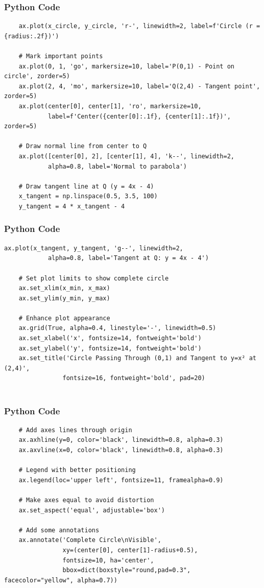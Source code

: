 \documentclass{beamer}
\numberwithin{equation}{section}
\begin{document}
\begin{frame}[fragile]
    \frametitle{Python Code}
    \begin{lstlisting}
    ax.plot(x_circle, y_circle, 'r-', linewidth=2, label=f'Circle (r = {radius:.2f})')
    
    # Mark important points
    ax.plot(0, 1, 'go', markersize=10, label='P(0,1) - Point on circle', zorder=5)
    ax.plot(2, 4, 'mo', markersize=10, label='Q(2,4) - Tangent point', zorder=5)
    ax.plot(center[0], center[1], 'ro', markersize=10, 
            label=f'Center({center[0]:.1f}, {center[1]:.1f})', zorder=5)
    
    # Draw normal line from center to Q
    ax.plot([center[0], 2], [center[1], 4], 'k--', linewidth=2, 
            alpha=0.8, label='Normal to parabola')
    
    # Draw tangent line at Q (y = 4x - 4)
    x_tangent = np.linspace(0.5, 3.5, 100)
    y_tangent = 4 * x_tangent - 4
\end{lstlisting}
\end{frame}
\begin{frame}[fragile]
    \frametitle{Python Code}
    \begin{lstlisting}
ax.plot(x_tangent, y_tangent, 'g--', linewidth=2, 
            alpha=0.8, label='Tangent at Q: y = 4x - 4')
    
    # Set plot limits to show complete circle
    ax.set_xlim(x_min, x_max)
    ax.set_ylim(y_min, y_max)
    
    # Enhance plot appearance
    ax.grid(True, alpha=0.4, linestyle='-', linewidth=0.5)
    ax.set_xlabel('x', fontsize=14, fontweight='bold')
    ax.set_ylabel('y', fontsize=14, fontweight='bold')
    ax.set_title('Circle Passing Through (0,1) and Tangent to y=x² at (2,4)', 
                fontsize=16, fontweight='bold', pad=20)
    
\end{lstlisting}
\end{frame}
\begin{frame}[fragile]
    \frametitle{Python Code}
    \begin{lstlisting}
    # Add axes lines through origin
    ax.axhline(y=0, color='black', linewidth=0.8, alpha=0.3)
    ax.axvline(x=0, color='black', linewidth=0.8, alpha=0.3)
    
    # Legend with better positioning
    ax.legend(loc='upper left', fontsize=11, framealpha=0.9)
    
    # Make axes equal to avoid distortion
    ax.set_aspect('equal', adjustable='box')
    
    # Add some annotations
    ax.annotate('Complete Circle\nVisible', 
                xy=(center[0], center[1]-radius+0.5), 
                fontsize=10, ha='center', 
                bbox=dict(boxstyle="round,pad=0.3", facecolor="yellow", alpha=0.7))
    \end{lstlisting}
\end{frame}
\end{document}
